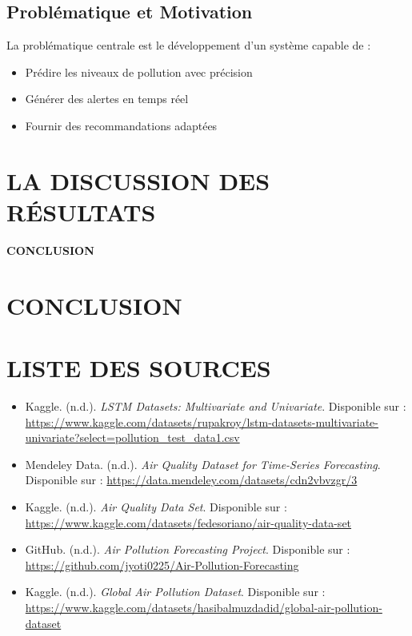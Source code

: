 \documentclass[12pt,a4paper]{report}
\begin{document}
\section{Problématique et Motivation}
La problématique centrale est le développement d'un système capable de :
\begin{itemize}
    \item Prédire les niveaux de pollution avec précision
    \item Générer des alertes en temps réel
    \item Fournir des recommandations adaptées
\end{itemize}

\chapter{LA DISCUSSION DES RÉSULTATS}
\lipsum[3-4]

\newpage
\thispagestyle{empty}
\begin{center}
\vspace*{\fill}
{\Huge\textbf{CONCLUSION}}
\vspace*{\fill}
\end{center}

\chapter{CONCLUSION}
\lipsum[5-6]

\newpage
{}
{}
\chapter*{LISTE DES SOURCES}
\sloppy %
\begin{itemize}
    \item Kaggle. (n.d.). \textit{LSTM Datasets: Multivariate and Univariate}. Disponible sur : \url{https://www.kaggle.com/datasets/rupakroy/lstm-datasets-multivariate-univariate?select=pollution_test_data1.csv}
    \item Mendeley Data. (n.d.). \textit{Air Quality Dataset for Time-Series Forecasting}. Disponible sur : \url{https://data.mendeley.com/datasets/cdn2vbvzgr/3}
    \item Kaggle. (n.d.). \textit{Air Quality Data Set}. Disponible sur : \url{https://www.kaggle.com/datasets/fedesoriano/air-quality-data-set}
    \item GitHub. (n.d.). \textit{Air Pollution Forecasting Project}. Disponible sur : \url{https://github.com/jyoti0225/Air-Pollution-Forecasting}
    \item Kaggle. (n.d.). \textit{Global Air Pollution Dataset}. Disponible sur : \url{https://www.kaggle.com/datasets/hasibalmuzdadid/global-air-pollution-dataset}
\end{itemize}
\end{document}
